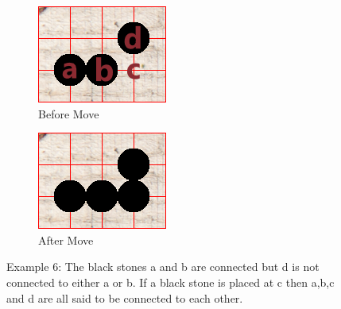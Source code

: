 \documentclass{l4proj}
\begin{document}
\begin{figure}[!h]
\centering
\begin{subfigure}[b]{0.45\textwidth}
\centering
\includegraphics[width=\textwidth]{ex/Ex6-0.png}
\caption{Before Move}
\label{fig:ex6-0}
\end{subfigure}
\begin{subfigure}[b]{0.45\textwidth}
\centering
\includegraphics[width=\textwidth]{ex/Ex6-1.png}
\caption{After Move}
\label{fig:ex6-1}
\end{subfigure}
\caption{Example 6: The black stones a and b are connected but d is not connected to either a or b. If a black stone is placed at c then a,b,c and d are all said to be connected to each other.}
\label{fig:ex6}
\end{figure}
\end{document}
